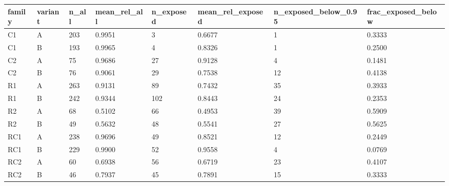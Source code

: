 \begin{tabular}{llllllll}
 \hline
 family & variant & n_all & mean_rel_all & n_exposed & mean_rel_exposed & n_exposed_below_0.95 & frac_exposed_below \\
 \hline
 C1 & A & 203 & 0.9951 & 3 & 0.6677 & 1 & 0.3333 \\
 C1 & B & 193 & 0.9965 & 4 & 0.8326 & 1 & 0.2500 \\
 C2 & A & 75 & 0.9686 & 27 & 0.9128 & 4 & 0.1481 \\
 C2 & B & 76 & 0.9061 & 29 & 0.7538 & 12 & 0.4138 \\
 R1 & A & 263 & 0.9131 & 89 & 0.7432 & 35 & 0.3933 \\
 R1 & B & 242 & 0.9344 & 102 & 0.8443 & 24 & 0.2353 \\
 R2 & A & 68 & 0.5102 & 66 & 0.4953 & 39 & 0.5909 \\
 R2 & B & 49 & 0.5632 & 48 & 0.5541 & 27 & 0.5625 \\
 RC1 & A & 238 & 0.9696 & 49 & 0.8521 & 12 & 0.2449 \\
 RC1 & B & 229 & 0.9900 & 52 & 0.9558 & 4 & 0.0769 \\
 RC2 & A & 60 & 0.6938 & 56 & 0.6719 & 23 & 0.4107 \\
 RC2 & B & 46 & 0.7937 & 45 & 0.7891 & 15 & 0.3333 \\
 \hline
\end{tabular}
